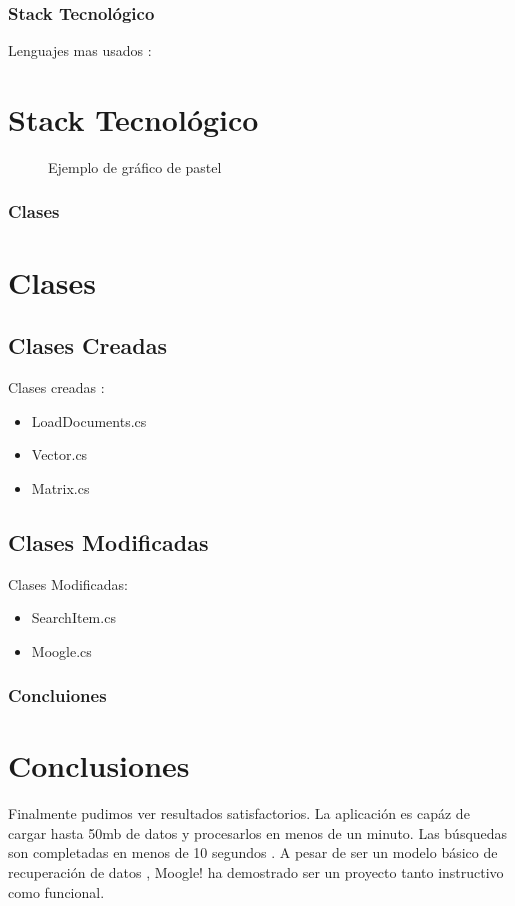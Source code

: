 \documentclass{beamer}
\begin{document}
	\begin{frame}
		\frametitle{Stack Tecnológico}{Lenguajes mas usados :}
			\section{Stack Tecnológico}
				
		
			\begin{figure}[htb]
			\centering
			\caption{Ejemplo de gráfico de pastel}
			\label{fig:grafico_pastel}
			\end{figure}
		
			
		
	

	\end{frame}
	\begin{frame}
		\frametitle{Clases}
			\section{Clases}
			\begin{multicols}{2}
			
			\subsection{Clases Creadas}
			Clases creadas :
			\begin{itemize}
				\item LoadDocuments.cs
				\item Vector.cs
				\item Matrix.cs
			
			\end{itemize}
			\subsection{Clases Modificadas}
			Clases Modificadas:
				\begin{itemize}
				\item SearchItem.cs
				\item Moogle.cs
				\end{itemize}
					
				
					
			\end{multicols}
				
		
		
	\end{frame}
	\begin{frame}
			\frametitle{Concluiones}
		    \section{Conclusiones}
			
			Finalmente pudimos ver resultados satisfactorios. La aplicación es capáz de cargar hasta 50mb de datos y procesarlos en menos de un minuto. Las búsquedas son completadas en menos de 10 segundos . A pesar de ser un modelo básico de recuperación de datos , Moogle! ha demostrado ser un proyecto tanto instructivo como funcional. 
	\end{frame}
	
\end{document}
